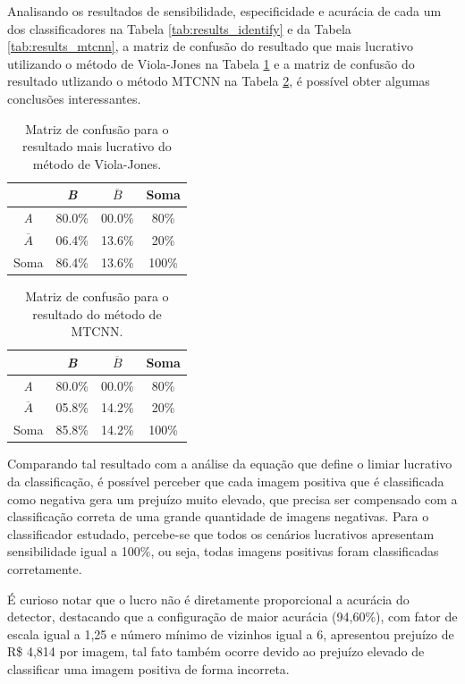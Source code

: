 Analisando os resultados de sensibilidade, especificidade e acurácia de cada um dos classificadores na Tabela \ref{tab:results_identify} e da Tabela \ref{tab:results_mtcnn}, a matriz de confusão do resultado que mais lucrativo utilizando o método de Viola-Jones na Tabela \ref{tab:matriz_de_confusao_viola} e a matriz de confusão do resultado utlizando o método MTCNN na Tabela \ref{tab:matriz_de_confusao_mtcnn}, é possível obter algumas conclusões interessantes.

\begin{table}[htbp]
    \caption{Matriz de confusão para o resultado mais lucrativo do método de Viola-Jones.}
    \label{tab:matriz_de_confusao_viola}
    \centering
    \renewcommand{\arraystretch}{1.4}
    \begin{tabular}{c|cc|c}\hline\hline
                       & \textit{B} & $\overline{B}$ & Soma  \\
        \hline
        \textit{A}     & 80.0\%     & 00.0\%         & 80\%  \\
        $\overline{A}$ & 06.4\%     & 13.6\%         & 20\%  \\
        \hline
        Soma           & 86.4\%     & 13.6\%         & 100\% \\
        \hline\hline
    \end{tabular}
\end{table}

\begin{table}[htbp]
    \caption{Matriz de confusão para o resultado do método de MTCNN.}
    \label{tab:matriz_de_confusao_mtcnn}
    \centering
    \renewcommand{\arraystretch}{1.4}
    \begin{tabular}{c|cc|c}\hline\hline
                       & \textit{B} & $\overline{B}$ & Soma  \\
        \hline
        \textit{A}     & 80.0\%     & 00.0\%         & 80\%  \\
        $\overline{A}$ & 05.8\%     & 14.2\%         & 20\%  \\
        \hline
        Soma           & 85.8\%     & 14.2\%         & 100\% \\
        \hline\hline
    \end{tabular}
\end{table}

Comparando tal resultado com a análise da equação que define o limiar lucrativo da classificação, é possível perceber que cada imagem positiva que é classificada como negativa gera um prejuízo muito elevado, que precisa ser compensado com a classificação correta de uma grande quantidade de imagens negativas. Para o classificador estudado, percebe-se que todos os cenários lucrativos apresentam sensibilidade igual a 100\%, ou seja, todas imagens positivas foram classificadas corretamente.

É curioso notar que o lucro não é diretamente proporcional a acurácia do detector, destacando que a configuração de maior acurácia (94,60\%), com fator de escala igual a 1,25 e número mínimo de vizinhos igual a 6, apresentou prejuízo de R\$ 4,814 por imagem, tal fato também ocorre devido ao prejuízo elevado de classificar uma imagem positiva de forma incorreta.

